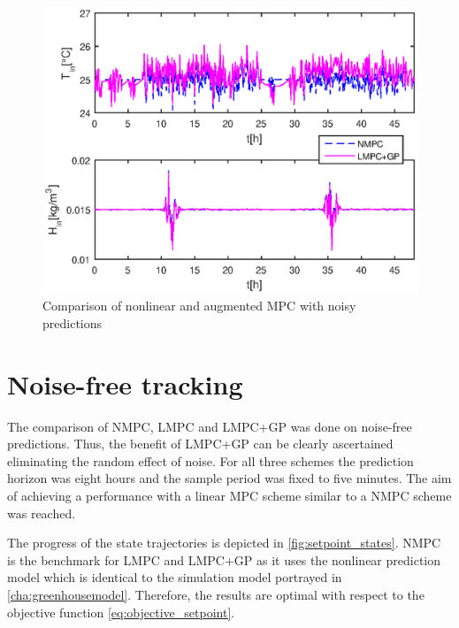 \begin{figure}[!t]
\begin{center}
		\includegraphics[width=\textwidth]{../Figures/setpoint_noise.eps}
		\caption{Comparison of nonlinear and augmented MPC with noisy predictions}
		\label{fig:noisy_mpc}
\end{center}
\end{figure}

\section{Noise-free tracking}
\label{sec:noisefree}

The comparison of NMPC, LMPC and LMPC+GP was done on noise-free predictions.
Thus, the benefit of LMPC+GP can be clearly ascertained eliminating the random effect of noise.
For all three schemes the prediction horizon was eight hours and the sample period was fixed to five minutes.
The aim of achieving a performance with a linear MPC scheme similar to a NMPC scheme was reached.

The progress of the state trajectories is depicted in \cref{fig:setpoint_states}.
NMPC is the benchmark for LMPC and LMPC+GP as it uses the nonlinear prediction model which is identical to the simulation model portrayed in \cref{cha:greenhousemodel}.
Therefore, the results are optimal with respect to the objective function \eqref{eq:objective_setpoint}.

